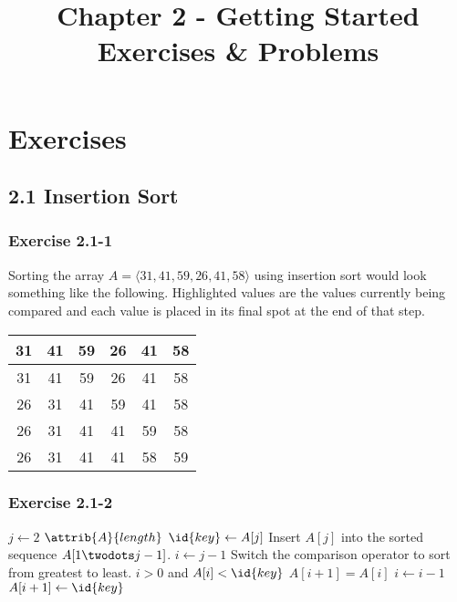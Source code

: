 \documentclass{article}
\title{Chapter 2 - Getting Started \\
Exercises \& Problems}
\date{}
\begin{document}
\maketitle
{}

\section*{Exercises}
\subsection*{2.1 Insertion Sort}
\subsubsection*{Exercise 2.1-1}
Sorting the array $A = \langle 31, 41, 59, 26, 41, 58 \rangle$ using insertion sort would look something like the following. Highlighted values are the values currently being compared and each value is placed in its final spot at the end of that step.

\begin{center}
    \begin {tabular}{|c|c|c|c|c|c|} \hline
    31  &   \cellcolor{blue!25}41   &   59  &   26  &   41  &   58  \\ \hline
    31  &   41  &   \cellcolor{blue!25}59   &   26  &   41  &   58  \\ \hline
    \cellcolor{blue!25}26   &   31  &   41  &   59  &   41  &   58  \\ \hline
    26  &   31  &   41  &   \cellcolor{blue!25}41   &   59  &   58  \\ \hline
    26  &   31  &   41  &   41  &   \cellcolor{blue!25}58   &   59  \\ \hline
    \end{tabular}
\end{center}

\subsubsection*{Exercise 2.1-2}

\begin{codebox}
\li \For $j \gets 2$ \To  $\attrib{A}{length}$
\li \Do
        $\id{key} \gets A[j]$
\li     \Comment Insert $A[j]$ into the sorted sequence
            $A[1 \twodots j-1]$.
\li     $i \gets j - 1$
\li     \Comment Switch the comparison operator to sort
            from greatest to least.
\li     \While $i > 0$ and $A[i] < \id{key}$
\li     \Do
            $A[i + 1] = A[i]$
\li         $i \gets i - 1$
        \End
\li     $A[i+1] \gets \id{key}$
    \End
\end{codebox}
\end{document}
